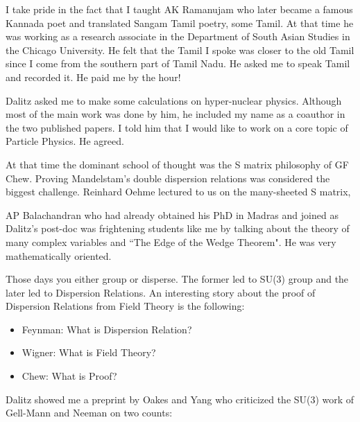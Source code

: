   
I take pride in the fact that I taught AK Ramanujam who later became
a famous Kannada poet and translated Sangam Tamil poetry, some Tamil.
At that time he was working as a research associate in the Department
of South Asian Studies in the Chica\-go University. He felt that the
Tamil I spoke was closer to the old Tamil since I come from the
southern part of Tamil Nadu. He asked me to speak Tamil and recorded it.
He paid me by the hour!


Dalitz asked me to make some calculations on hyper-nuclear physics. 
Although most of the main work was done by him, he included my name as a 
coauthor in the two published papers. I told him that I would like to 
work on a core topic of Particle Physics. He agreed.


At that time the dominant school of thought was the S matrix philosophy 
of GF Chew. Proving Mandelstam's double dispersion relations was 
considered the biggest challenge. Reinhard Oehme lectured to us on the 
many-sheeted S matrix, 


AP Balachandran who had already obtained his PhD in Mad\-ras and joined as 
Dalitz's post-doc was frightening students like me by talking about the 
theory of many complex variables and ``The Edge of the Wedge Theorem". He 
was very mathemati\-cally orien\-ted.


Those days you either group or disperse. The former led to SU(3) group 
and the later led to Dispersion Relations. An intere\-sting story about 
the proof of Dispersion Relations from Field Theory is the following:

\vspace{-\topsep}
\begin{itemize}
\itemsep=0pt
\item Feynman: What is Dispersion Relation? 
\item Wigner: What is Field Theory? 
\item Chew: What is Proof?
\end{itemize}
\vspace{-\topsep}

Dalitz showed me a preprint by Oakes and Yang who criticized the SU(3) 
work of Gell-Mann and Neeman on two counts:

